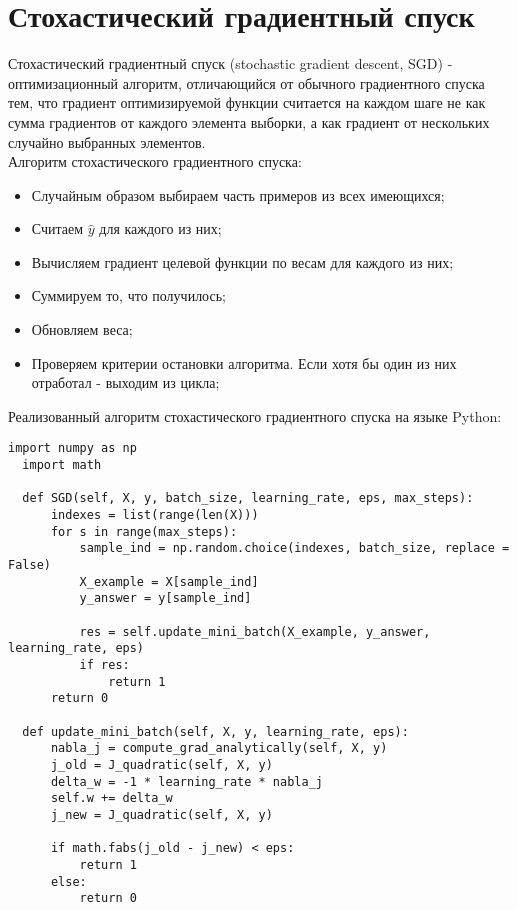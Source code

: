 
\section{Стохастический градиентный спуск}

Стохастический градиентный спуск (stochastic gradient descent, SGD) - оптимизационный алгоритм, отличающийся от обычного градиентного спуска тем, что градиент оптимизируемой функции считается на каждом шаге не как сумма градиентов от каждого элемента выборки, а как градиент от нескольких случайно выбранных элементов. \\

Алгоритм стохастического градиентного спуска:
\begin{itemize}
  \item Случайным образом выбираем часть примеров из всех имеющихся;
  \item Считаем $\hat{y}$ для каждого из них;
  \item Вычисляем градиент целевой функции по весам для каждого из них;
  \item Суммируем то, что получилось;
  \item Обновляем веса;
  \item Проверяем критерии остановки алгоритма. Если хотя бы один из них отработал - выходим из цикла;
\end{itemize}

Реализованный алгоритм стохастического градиентного спуска на языке Python:

\begin{lstlisting}[caption={Стохастический градиентный спуск}]
  import numpy as np
  import math
  
  def SGD(self, X, y, batch_size, learning_rate, eps, max_steps):
      indexes = list(range(len(X)))
      for s in range(max_steps):
          sample_ind = np.random.choice(indexes, batch_size, replace = False)
          X_example = X[sample_ind]
          y_answer = y[sample_ind]
              
          res = self.update_mini_batch(X_example, y_answer, learning_rate, eps) 
          if res: 
              return 1 
      return 0
  
  def update_mini_batch(self, X, y, learning_rate, eps):
      nabla_j = compute_grad_analytically(self, X, y)
      j_old = J_quadratic(self, X, y)
      delta_w = -1 * learning_rate * nabla_j
      self.w += delta_w
      j_new = J_quadratic(self, X, y)
      
      if math.fabs(j_old - j_new) < eps:
          return 1
      else:
          return 0
\end{lstlisting}